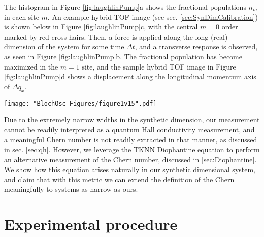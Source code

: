 The histogram in Figure \ref{fig:laughlinPump}a shows the fractional populations $n_m$ in each site $m$. An example hybrid TOF image (see sec. \ref{sec:SynDimCalibration}) is shown below in Figure \ref{fig:laughlinPump}c, with the central $m=0$ order marked by red cross-hairs. Then, a force is applied along the long (real) dimension of the system for some time $\Delta t$, and a transverse response is observed, as seen in  Figure \ref{fig:laughlinPump}b. The fractional population has become maximized in the $m=1$ site, and the sample hybrid TOF image in Figure \ref{fig:laughlinPump}d shows a displacement along the longitudinal momentum axis of $\Delta q_x$. 

\begin{figure*}
\texttt{[image: "BlochOsc Figures/figure1v15".pdf]}
\caption[Quantum Hall effect in Hofstadter ribbons]{Quantum Hall effect in Hofstadter ribbons. (a) 5-site wide ribbon with real tunneling coefficients along $\bf{\mathit{e}_s}$   and complex tunneling coefficients along \ex,  creating a non-zero phase  $\phi$ around each plaquette. (b) After applying a force along \ex  for a time $\Delta t$, atomic populations shift transversely along $\bf{\mathit{e}_s}$, signaling the Hall effect. (c,d)  TOF absorption images giving hybrid momentum/position density distributions $n(k_x,m)$. Prior to applying the force (c), the $m=0$ momentum peak is at $k_x=0$, marked by the red cross. Then, in (d), the force directly changed $q_x$, evidenced by the displacement $\Delta q_x$ of crystal momentum, and via the Hall effect shifted population along $\bf{\mathit{e}_s}$. }
\label{fig:laughlinPump}
\end{figure*}

Due to the extremely narrow widths in the synthetic dimension, our measurement cannot be readily interpreted as a quantum Hall conductivity measurement, and a meaningful Chern number is not readily extracted in that manner, as discussed in sec. \ref{sec:qh}. However, we leverage the TKNN Diophantine equation \cite{Thouless1982} to perform an alternative measurement of the Chern number, discussed in \ref{sec:Diophantine}. We show how this equation arises naturally in our synthetic dimensional system, and claim that with this metric we can extend the definition of the Chern meaningfully to systems as narrow as ours.  

\section{Experimental procedure}

